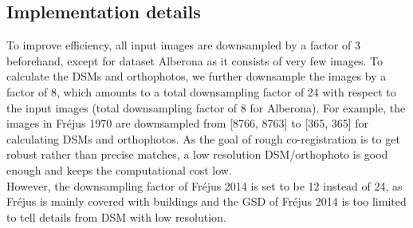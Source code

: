 \subsection{Implementation details}
\label{Implementationdetails}
To improve efficiency, all input images are downsampled by a factor of 3 beforehand, except for dataset Alberona as it consists of very few images. To calculate the \ac{DSM}s and orthophotos, we further downsample the images by a factor of 8, which amounts to a total downsampling factor of 24 with respect to the input images (total downsampling factor of 8 for Alberona). For example, the images in Fr{\'e}jus 1970 are downsampled from [8766, 8763] to [365, 365] for calculating \ac{DSM}s and orthophotos. As the goal of rough co-registration is to get robust rather than precise matches, a low resolution \ac{DSM}/orthophoto is good enough and keeps the computational cost low. \\
However, the downsampling factor of Fr{\'e}jus 2014 is set to be 12 instead of 24, as Fr{\'e}jus is mainly covered with buildings and the GSD of Fr{\'e}jus 2014 is too limited to tell details from \ac{DSM} with low resolution.\\%
